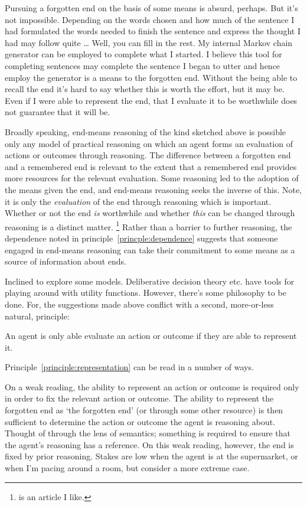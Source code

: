 \documentclass[10pt]{article}
\begin{document}
Pursuing a forgotten end on the basis of some means is absurd, perhaps.
But it's not impossible.
Depending on the words chosen and how much of the sentence I had formulated the words needed to finish the sentence and express the thought I had may follow quite \dots
Well, you can fill in the rest.
My internal Markov chain generator can be employed to complete what I started.
I believe this tool for completing sentences may complete the sentence I began to utter and hence employ the generator is a means to the forgotten end.
Without the being able to recall the end it's hard to say whether this is worth the effort, but it may be.
Even if I were able to represent the end, that I evaluate it to be worthwhile does not guarantee that it will be.

Broadly speaking, end-means reasoning of the kind sketched above is possible only any model of practical reasoning on which an agent forms an evaluation of actions or outcomes through reasoning.
The difference between a forgotten end and a remembered end is relevant to the extent that a remembered end provides more resources for the relevant evaluation.
Some reasoning led to the adoption of the means given the end, and end-means reasoning seeks the inverse of this.
Note, it is only the \emph{evaluation} of the end through reasoning which is important.
Whether or not the end \emph{is} worthwhile and whether \emph{this} can be changed through reasoning is a distinct matter.\nolinebreak
\footnote{\citeauthor{Smith:2004aa} is an article I like.}
Rather than a barrier to further reasoning, the dependence noted in principle~\ref{princple:dependence} suggests that someone engaged in end-means reasoning can take their commitment to some means as a source of information about ends.

Inclined to explore some models.
Deliberative decision theory etc. have tools for playing around with utility functions.
However, there's some philosophy to be done.
For, the suggestions made above conflict with a second, more-or-less natural, principle:

\begin{principle}\label{principle:representation}
  An agent is only able evaluate an action or outcome if they are able to represent it.
\end{principle}

Principle~\ref{principle:representation} can be read in a number of ways.

On a weak reading, the ability to represent an action or outcome is required only in order to fix the relevant action or outcome.
The ability to represent the forgotten end as `the forgotten end' (or through some other resource) is then sufficient to determine the action or outcome the agent is reasoning about.
Thought of through the lens of semantics; something is required to ensure that the agent's reasoning has a reference.
On this weak reading, however, the end is fixed by prior reasoning.
Stakes are low when the agent is at the supermarket, or when I'm pacing around a room, but consider a more extreme case.
\end{document}
